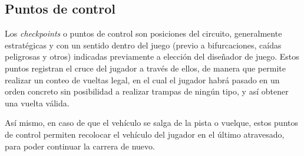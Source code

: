 \subsection{Puntos de control}

Los \textit{checkpoints} o puntos de control son posiciones del circuito, generalmente estratégicas y con un sentido dentro del juego (previo a bifurcaciones, caídas peligrosas y otros) indicadas previamente a elección del diseñador de juego. Estos puntos registran el cruce del jugador a través de ellos, de manera que permite realizar un conteo de vueltas legal, en el cual el jugador habrá pasado en un orden concreto sin posibilidad a realizar trampas de ningún tipo, y así obtener una vuelta válida.

Así mismo, en caso de que el vehículo se salga de la pista o vuelque, estos puntos de control permiten recolocar el vehículo del jugador en el último atravesado, para poder continuar la carrera de nuevo.